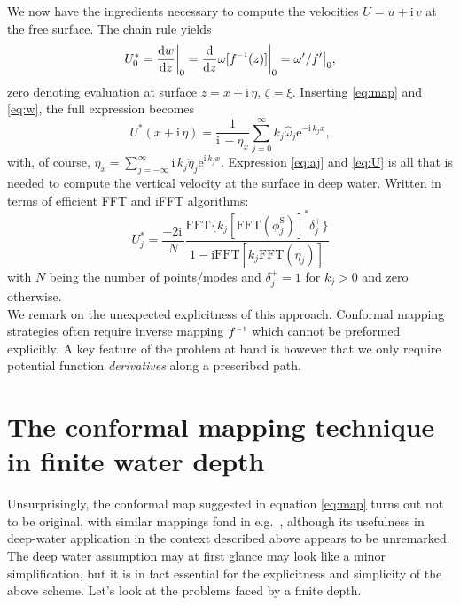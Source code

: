 \documentclass[a4paper,12pt]{article}
\newcommand{\mr}{\mathrm}
\renewcommand{\S}{^\mr{S}}
\newcommand{\ii}{\mr{i}\,}
\newcommand{\ee}{\mr{e}}
\renewcommand{\_}[1]{_\mr{#1}}
\newcommand{\w}{w}
\newcommand{\h}{\hat}
\newcommand{\z}{z}
\newcommand{\x}{x}
\newcommand{\zz}{\zeta}
\newcommand{\xx}{\xi}
\newcommand{\zmap}{f}
\newcommand{\zzmap}{\zmap^{\raisebox{.2ex}{$\scriptscriptstyle-1$}}}
\newcommand{\ww}{\omega}
\renewcommand{\w}{w}
\newcommand{\surf}{\eta}
\newcommand{\dd}[2]{\frac{\mr d #1}{\mr d #2}}
\begin{document}
We now have the ingredients necessary to compute the velocities $U=u+\ii v$ at the free surface. 
The chain rule yields
\begin{equation*}
U_0^* = \dd{\w}{\z}\bigg|_{0} = \dd{}{\z}\ww[\zzmap(\z)]\bigg|_0 = \ww'/\zmap' \big|_0,
\end{equation*}
zero denoting evaluation at surface $\z=\x+\ii\surf$, $\zz=\xx$.
Inserting \eqref{eq:map} and \eqref{eq:w}, the full expression becomes
\begin{equation}
U^*(\x+\ii\surf) = \frac{1}{\ii- \surf_{\x}}\sum_{j=0}^\infty  k_j \h\ww_j \ee^{-\ii k_j \x},
\label{eq:U}
\end{equation}
with, of course, $\surf_\x=\sum_{j=-\infty}^\infty\ii k_j\h\surf_j\ee^{\ii k_j \x}$.
Expression \eqref{eq:aj} and \eqref{eq:U} is all that is needed to compute the vertical velocity at the surface in deep water. Written in terms of efficient FFT and iFFT algorithms:
\begin{equation}
U_j^* = \frac{-2\ii}{N} \frac{  \mr{FFT}\{k_j [\mr{FFT}(\phi_j\S)]^* \delta_{j}^+\}}{ 1-\mr{iFFT}[k_j \mr{FFT}(\eta_j)]}
\end{equation}
with $N$ being the number of points/modes and $\delta_{j}^+=1$ for $k_j>0$ and zero otherwise.
\\

We remark on the unexpected explicitness of this approach. 
Conformal mapping strategies often require inverse mapping $\zzmap$ which cannot be preformed explicitly. 
A key feature of the problem at hand is however that we only require potential function \textit{derivatives} along a prescribed path.






\section{The conformal mapping technique in finite water depth}
\label{sec:finiteDepth}
Unsurprisingly, the conformal map suggested in equation \eqref{eq:map} turns out not to be original, with similar mappings fond in e.g.~\citet{chalikov2005modeling}, although its usefulness in deep-water application in the context described above appears to be unremarked.
The deep water assumption may at first glance may look like a minor simplification, but it is in fact essential for the explicitness and simplicity of the above scheme. 
Let's look at the problems faced by a finite depth.
\\
\end{document}
